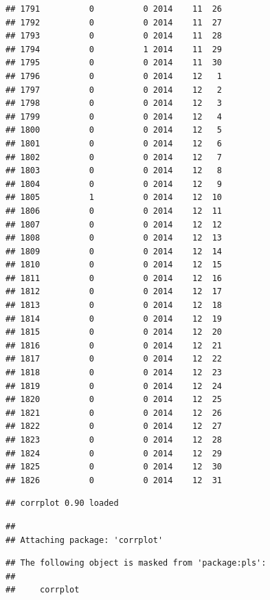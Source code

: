 \documentclass[
]{article}
\begin{document}
\begin{verbatim}
## 1791          0          0 2014    11  26
## 1792          0          0 2014    11  27
## 1793          0          0 2014    11  28
## 1794          0          1 2014    11  29
## 1795          0          0 2014    11  30
## 1796          0          0 2014    12   1
## 1797          0          0 2014    12   2
## 1798          0          0 2014    12   3
## 1799          0          0 2014    12   4
## 1800          0          0 2014    12   5
## 1801          0          0 2014    12   6
## 1802          0          0 2014    12   7
## 1803          0          0 2014    12   8
## 1804          0          0 2014    12   9
## 1805          1          0 2014    12  10
## 1806          0          0 2014    12  11
## 1807          0          0 2014    12  12
## 1808          0          0 2014    12  13
## 1809          0          0 2014    12  14
## 1810          0          0 2014    12  15
## 1811          0          0 2014    12  16
## 1812          0          0 2014    12  17
## 1813          0          0 2014    12  18
## 1814          0          0 2014    12  19
## 1815          0          0 2014    12  20
## 1816          0          0 2014    12  21
## 1817          0          0 2014    12  22
## 1818          0          0 2014    12  23
## 1819          0          0 2014    12  24
## 1820          0          0 2014    12  25
## 1821          0          0 2014    12  26
## 1822          0          0 2014    12  27
## 1823          0          0 2014    12  28
## 1824          0          0 2014    12  29
## 1825          0          0 2014    12  30
## 1826          0          0 2014    12  31
\end{verbatim}

\begin{verbatim}
## corrplot 0.90 loaded
\end{verbatim}

\begin{verbatim}
## 
## Attaching package: 'corrplot'
\end{verbatim}

\begin{verbatim}
## The following object is masked from 'package:pls':
## 
##     corrplot
\end{verbatim}
\end{document}
